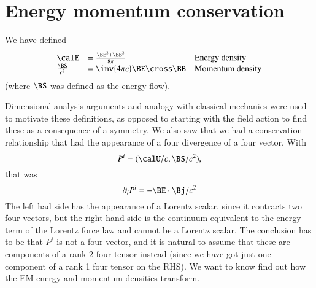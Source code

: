 %
%
\section{Energy momentum conservation}

We have defined
%
\begin{equation}\label{eqn:relativisticElectrodynamicsL21b:320}
\begin{array}{l l l}
\calE &= \frac{\BE^2 + \BB^2}{8\pi} & \mbox{Energy density} \\
\frac{\BS}{c^2} &= \inv{4 \pi c} \BE \cross \BB & \mbox{Momentum density}
\end{array}
\end{equation}
%
(where \(\BS\) was defined as the energy flow).

Dimensional analysis arguments and analogy with classical mechanics were used to motivate these definitions, as opposed to starting with the field action to find these as a consequence of a symmetry.  We also saw that we had a conservation relationship that had the appearance of a four divergence of a four vector.  With
%
\begin{equation}\label{eqn:relativisticElectrodynamicsL21b:340}
P^i = (\calU/c, \BS/c^2),
\end{equation}
%
that was
%
\begin{equation}\label{eqn:relativisticElectrodynamicsL21b:360}
\partial_i P^i = - \BE \cdot \Bj/c^2
\end{equation}
%
The left had side has the appearance of a Lorentz scalar, since it contracts two four vectors, but the right hand side is the continuum equivalent to the energy term of the Lorentz force law and cannot be a Lorentz scalar.  The conclusion has to be that \(P^i\) is not a four vector, and it is natural to assume that these are components of a rank 2 four tensor instead (since we have got just one component of a rank 1 four tensor on the RHS).  We want to know find out how the EM energy and momentum densities transform.
%
